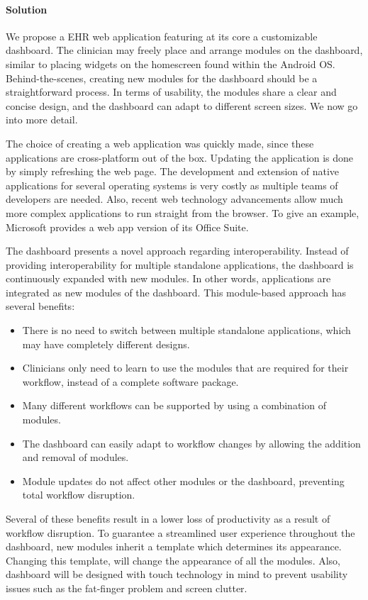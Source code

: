     \paragraph{Solution} We propose a EHR web application featuring at its core a customizable dashboard. The clinician may freely place and arrange modules on the dashboard, similar to placing widgets on the homescreen found within the Android OS\@. Behind-the-scenes, creating new modules for the dashboard should be a straightforward process. In terms of usability, the modules share a clear and concise design, and the dashboard can adapt to different screen sizes. We now go into more detail.

    The choice of creating a web application was quickly made, since these applications are cross-platform out of the box. Updating the application is done by simply refreshing the web page. The development and extension of native applications for several operating systems is very costly as multiple teams of developers are needed. Also, recent web technology advancements allow much more complex applications to run straight from the browser. To give an example, Microsoft provides a web app version of its Office Suite. 

    The dashboard presents a novel approach regarding interoperability. Instead of providing interoperability for multiple standalone applications, the dashboard is continuously expanded with new modules. In other words, applications are integrated as new modules of the dashboard. This module-based approach has several benefits:
    \begin{itemize}
        \item There is no need to switch between multiple standalone applications, which may have completely different designs.
        \item Clinicians only need to learn to use the modules that are required for their workflow, instead of a complete software package.
        \item Many different workflows can be supported by using a combination of modules.
        \item The dashboard can easily adapt to workflow changes by allowing the addition and removal of modules.
        \item Module updates do not affect other modules or the dashboard, preventing total workflow disruption.
    \end{itemize}

    \noindent Several of these benefits result in a lower loss of productivity as a result of workflow disruption. To guarantee a streamlined user experience throughout the dashboard, new modules inherit a template which determines its appearance. Changing this template, will change the appearance of all the modules. Also, dashboard will be designed with touch technology in mind to prevent usability issues such as the fat-finger problem and screen clutter. 
 
